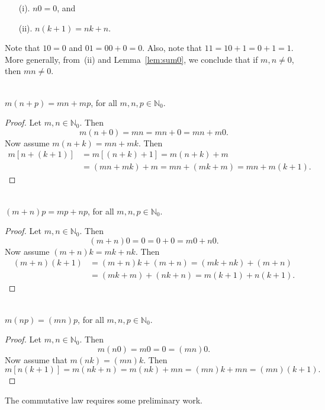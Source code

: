 \begin{enumerate}
\item[(i).] $n0=0$, and
\item[(ii).] $n(k+1)=nk +n$.
\end{enumerate}

Note that $10=0$ and $01=00+0=0$.  Also, note that $11=10+1=0+1=1$.
More generally, from~(ii) and Lemma~\ref{lem:sum0}, we 
conclude that if $m,n\neq0$, then $mn\neq0$.

\begin{theorem}{}\\
$m(n+p)=mn + mp$, for all $m,n,p\in \mathbb{N}_0$.
\end{theorem}

\begin{proof}
Let $m,n\in \mathbb{N}_0$.  Then 
\[
m(n+0)=mn = mn +0 = mn+ m0.
\]
Now assume $m(n+k) = mn + mk$.
Then
\begin{align*}
m[n+(k+1)] &= m[(n+k)+1]=m(n+k)+m\\
&=(mn+mk)+m=mn+(mk+m)= mn+m(k+1).
\end{align*}
\end{proof}

\begin{theorem}{}\\
$(m+n)p=mp + np$, for all $m,n,p\in \mathbb{N}_0$.
\end{theorem}

\begin{proof}
Let $m,n\in \mathbb{N}_0$.  Then
\[
(m+n)0 =0 = 0+0 = m0 + n0.
\]
Now assume $(m+n)k = mk + nk$.
Then
\begin{align*}
(m+n)(k+1)&=(m+n)k+(m+n)= (mk+nk) +(m+n)\\
&=(mk+m)+(nk+n)=m(k+1)+n(k+1).
\end{align*}
\end{proof}

\begin{theorem}{}\\
$m(np) = (mn)p$, for all $m,n,p\in \mathbb{N}_0$.
\end{theorem}

\begin{proof}
Let $m,n\in \mathbb{N}_0$.  Then
\[
m(n0)= m0 = 0 = (mn)0.
\]
Now assume that $m(nk)=(mn)k$.  Then
\[
m[n(k+1)]= m(nk + n)= m(nk) + mn =(mn)k + mn = (mn)(k+1).
\]
\end{proof}

The commutative law requires  some preliminary work.

